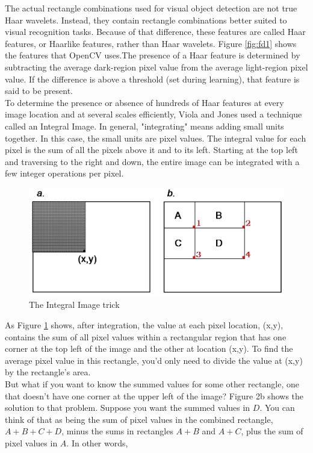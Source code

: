 \documentclass[12pt]{report}			%
\begin{document}
The actual rectangle combinations used for visual object detection are not true Haar wavelets. Instead, they contain rectangle combinations better suited to visual recognition tasks. Because of that difference, these features are called Haar features, or Haarlike features, rather than Haar wavelets. Figure \ref{fig:fd1} shows the features that OpenCV uses.The presence of a Haar feature is determined by subtracting the average dark-region pixel value from the average light-region pixel value. If the difference is above a threshold (set during learning), that feature is said to be present.\\
To determine the presence or absence of hundreds of Haar features at every image location and at several scales efficiently, Viola and Jones used a technique called an Integral Image. In general, "integrating" means adding small units together. In this case, the small units are pixel values. The integral value for each pixel is the sum of all the pixels above it and to its left. Starting at the top left and traversing to the right and down, the entire image can be integrated with a few integer operations per pixel.\\
\begin{figure}[h!]
	\centering
	\includegraphics[scale=0.3]{img/fd3.png}
	\caption{The Integral Image trick}
	\label{fig:fd2}
\end{figure}
As Figure \ref{fig:fd2} shows, after integration, the value at each pixel location, (x,y), contains the sum of all pixel values within a rectangular region that has one corner at the top left of the image and the other at location (x,y). To find the average pixel value in this rectangle, you'd only need to divide the value at (x,y) by the rectangle's area.\\
But what if you want to know the summed values for some other rectangle, one that doesn't have one corner at the upper left of the image? Figure 2b shows the solution to that problem. Suppose you want the summed values in $D$. You can think of that as being the sum of pixel values in the combined rectangle, $A+B+C+D$, minus the sums in rectangles $A+B$ and $A+C$, plus the sum of pixel values in $A$. In other words,
\end{document}
